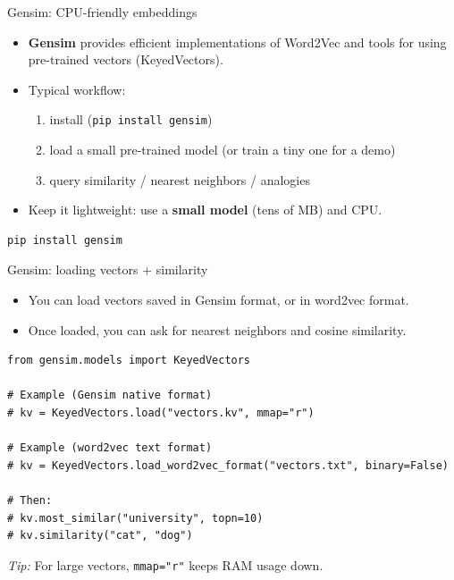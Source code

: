 \documentclass[aspectratio=169]{beamer}
\begin{document}
\begin{frame}[fragile]{Gensim: CPU-friendly embeddings}
\begin{itemize}
  \item \textbf{Gensim} provides efficient implementations of Word2Vec and tools for using
        pre-trained vectors (KeyedVectors).
  \item Typical workflow:
    \begin{enumerate}
      \item install (\texttt{pip install gensim})
      \item load a small pre-trained model (or train a tiny one for a demo)
      \item query similarity / nearest neighbors / analogies
    \end{enumerate}
  \item Keep it lightweight: use a \textbf{small model} (tens of MB) and CPU.
\end{itemize}

\begin{verbatim}
pip install gensim
\end{verbatim}
\end{frame}

\begin{frame}[fragile]{Gensim: loading vectors + similarity}
\begin{itemize}
  \item You can load vectors saved in Gensim format, or in word2vec format.
  \item Once loaded, you can ask for nearest neighbors and cosine similarity.
\end{itemize}

\begin{verbatim}
from gensim.models import KeyedVectors

# Example (Gensim native format)
# kv = KeyedVectors.load("vectors.kv", mmap="r")

# Example (word2vec text format)
# kv = KeyedVectors.load_word2vec_format("vectors.txt", binary=False)

# Then:
# kv.most_similar("university", topn=10)
# kv.similarity("cat", "dog")
\end{verbatim}

\small
\textit{Tip:} For large vectors, \texttt{mmap="r"} keeps RAM usage down.
\end{frame}
\end{document}
